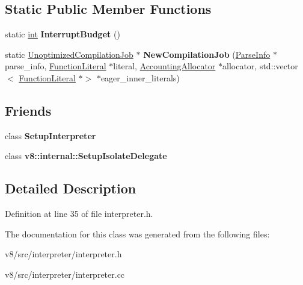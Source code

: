 \subsection*{Static Public Member Functions}
\begin{DoxyCompactItemize}
\item 
\mbox{\label{classv8_1_1internal_1_1interpreter_1_1Interpreter_a38cd11e6d5af0fc621b321ff2d8fbdbd}} 
static \mbox{\hyperlink{classint}{int}} {\bfseries Interrupt\+Budget} ()
\item 
\mbox{\label{classv8_1_1internal_1_1interpreter_1_1Interpreter_aae49a73ec472a996358935eef6486f80}} 
static \mbox{\hyperlink{classv8_1_1internal_1_1UnoptimizedCompilationJob}{Unoptimized\+Compilation\+Job}} $\ast$ {\bfseries New\+Compilation\+Job} (\mbox{\hyperlink{classv8_1_1internal_1_1ParseInfo}{Parse\+Info}} $\ast$parse\+\_\+info, \mbox{\hyperlink{classv8_1_1internal_1_1FunctionLiteral}{Function\+Literal}} $\ast$literal, \mbox{\hyperlink{classv8_1_1internal_1_1AccountingAllocator}{Accounting\+Allocator}} $\ast$allocator, std\+::vector$<$ \mbox{\hyperlink{classv8_1_1internal_1_1FunctionLiteral}{Function\+Literal}} $\ast$$>$ $\ast$eager\+\_\+inner\+\_\+literals)
\end{DoxyCompactItemize}
\subsection*{Friends}
\begin{DoxyCompactItemize}
\item 
\mbox{\label{classv8_1_1internal_1_1interpreter_1_1Interpreter_ad86b676d3e5a66d1e5e3e77597f8e4c6}} 
class {\bfseries Setup\+Interpreter}
\item 
\mbox{\label{classv8_1_1internal_1_1interpreter_1_1Interpreter_a5bc2e088b5a79aa965189cc55ab06e66}} 
class {\bfseries v8\+::internal\+::\+Setup\+Isolate\+Delegate}
\end{DoxyCompactItemize}


\subsection{Detailed Description}


Definition at line 35 of file interpreter.\+h.



The documentation for this class was generated from the following files\+:\begin{DoxyCompactItemize}
\item 
v8/src/interpreter/interpreter.\+h\item 
v8/src/interpreter/interpreter.\+cc\end{DoxyCompactItemize}
